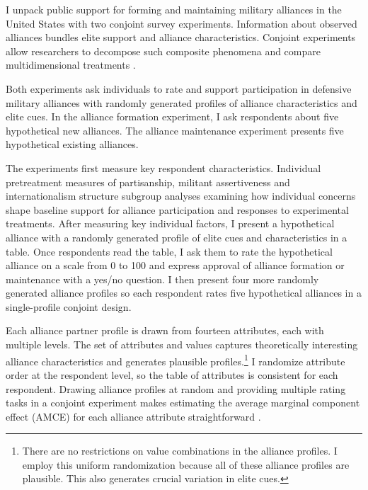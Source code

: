 \documentclass[12pt]{article}
\begin{document}
I unpack public support for forming and maintaining military alliances in the United States with two conjoint survey experiments. 
Information about observed alliances bundles elite support and alliance characteristics. 
Conjoint experiments allow researchers to decompose such composite phenomena and compare multidimensional treatments \citep{Hainmuelleretal2014}. 


Both experiments ask individuals to rate and support participation in defensive military alliances with randomly generated profiles of alliance characteristics and elite cues. 
In the alliance formation experiment, I ask respondents about five hypothetical new alliances. 
The alliance maintenance experiment presents five hypothetical existing alliances.


The experiments first measure key respondent characteristics.  
Individual pretreatment measures of partisanship, militant assertiveness and internationalism structure subgroup analyses examining how individual concerns shape baseline support for alliance participation and responses to experimental treatments. 
After measuring key individual factors, I present a hypothetical alliance with a randomly generated profile of elite cues and characteristics in a table.
Once respondents read the table, I ask them to rate the hypothetical alliance on a scale from 0 to 100 and express approval of alliance formation or maintenance with a yes/no question. 
I then present four more randomly generated alliance profiles so each respondent rates five hypothetical alliances in a single-profile conjoint design.


Each alliance partner profile is drawn from fourteen attributes, each with multiple levels. 
The set of attributes and values captures theoretically interesting alliance characteristics and generates plausible profiles.\footnote{There are no restrictions on value combinations in the alliance profiles. I employ this uniform randomization because all of these alliance profiles are plausible. This also generates crucial variation in elite cues.}
I randomize attribute order at the respondent level, so the table of attributes is consistent for each respondent. 
Drawing alliance profiles at random and providing multiple rating tasks in a conjoint experiment makes estimating the average marginal component effect (AMCE) for each alliance attribute straightforward \citep{Hainmuelleretal2014}. 
\end{document}
